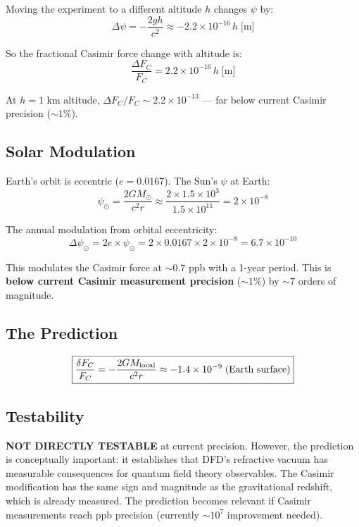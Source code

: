 \documentclass[11pt]{article}
\begin{document}
Moving the experiment to a different altitude $h$ changes $\psi$ by:
\begin{equation}
\Delta\psi = -\frac{2g h}{c^2} \approx -2.2 \times 10^{-16}\,h\;\text{[m]}
\end{equation}

So the fractional Casimir force change with altitude is:
\begin{equation}
\frac{\Delta F_C}{F_C} = 2.2 \times 10^{-16}\,h\;\text{[m]}
\end{equation}

At $h = 1$ km altitude, $\Delta F_C / F_C \sim 2.2 \times 10^{-13}$ --- far below
current Casimir precision ($\sim 1\%$).

\subsection{Solar Modulation}

Earth's orbit is eccentric ($e = 0.0167$). The Sun's $\psi$ at Earth:
\begin{equation}
\psi_\odot = \frac{2GM_\odot}{c^2 r} \approx \frac{2 \times 1.5 \times 10^3}{1.5 \times 10^{11}} = 2 \times 10^{-8}
\end{equation}

The annual modulation from orbital eccentricity:
\begin{equation}
\Delta\psi_\odot = 2e \times \psi_\odot = 2 \times 0.0167 \times 2 \times 10^{-8} = 6.7 \times 10^{-10}
\end{equation}

This modulates the Casimir force at $\sim 0.7$ ppb with a 1-year period. This is
\textbf{below current Casimir measurement precision} ($\sim 1\%$) by $\sim 7$ orders
of magnitude.

\subsection{The Prediction}

\begin{equation}
\boxed{\frac{\delta F_C}{F_C} = -\frac{2G M_{\rm local}}{c^2 r} \approx -1.4 \times 10^{-9}\;\text{(Earth surface)}}
\end{equation}

\subsection{Testability}

\textbf{NOT DIRECTLY TESTABLE} at current precision. However, the prediction is
conceptually important: it establishes that DFD's refractive vacuum has measurable
consequences for quantum field theory observables. The Casimir modification has the
same sign and magnitude as the gravitational redshift, which is already measured.
The prediction becomes relevant if Casimir measurements reach ppb precision (currently
$\sim 10^7$ improvement needed).
\end{document}
